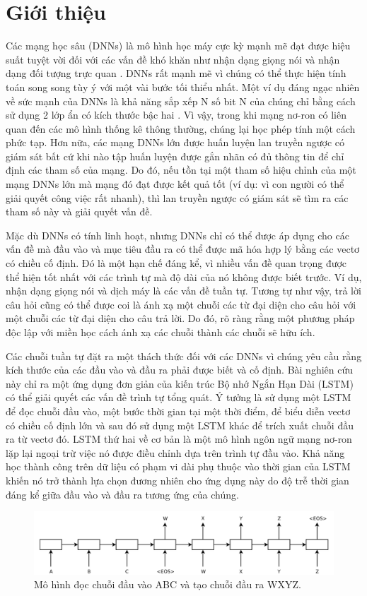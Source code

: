 \section{Giới thiệu}
Các mạng học sâu (DNNs) là mô hình học máy cực kỳ mạnh mẽ đạt được hiệu suất tuyệt vời đối với các vấn đề khó khăn như nhận dạng giọng nói \citep{hinton2012deep, DBLP:journals/taslp/DahlYDA12} và nhận dạng đối tượng trực quan \citep{DBLP:journals/cacm/KrizhevskySH17, DBLP:conf/cvpr/CiresanMS12, lecun1998gradient, LeRMDCCDN12}. DNNs rất mạnh mẽ vì chúng có thể thực hiện tính toán song song tùy ý với một vài bước tối thiểu nhất. Một ví dụ đáng ngạc nhiên về sức mạnh của DNNs là khả năng sắp xếp N số bit N của chúng chỉ bằng cách sử dụng 2 lớp ẩn có kích thước bậc hai \citep{DBLP:conf/swat/Razborov92}. Vì vậy, trong khi mạng nơ-ron có liên quan đến các mô hình thống kê thông thường, chúng lại học phép tính một cách phức tạp. Hơn nữa, các mạng DNNs lớn được huấn luyện lan truyền ngược có giám sát bất cứ khi nào tập huấn luyện được gắn nhãn có đủ thông tin để chỉ định các tham số của mạng. Do đó, nếu tồn tại một tham số hiệu chỉnh của một mạng DNNs lớn mà mạng đó đạt được kết quả tốt (ví dụ: vì con người có thể giải quyết công việc rất nhanh), thì lan truyền ngược có giám sát sẽ tìm ra các tham số này và giải quyết vấn đề.

Mặc dù DNNs có tính linh hoạt, nhưng DNNs chỉ có thể được áp dụng cho các vấn đề mà đầu vào và mục tiêu đầu ra có thể được mã hóa hợp lý bằng các vectơ có chiều cố định. Đó là một hạn chế đáng kể, vì nhiều vấn đề quan trọng được thể hiện tốt nhất với các trình tự mà độ dài của nó không được biết trước. Ví dụ, nhận dạng giọng nói và dịch máy là các vấn đề tuần tự. Tương tự như vậy, trả lời câu hỏi cũng có thể được coi là ánh xạ một chuỗi các từ đại diện cho câu hỏi với một chuỗi các từ đại diện cho câu trả lời. Do đó, rõ ràng rằng một phương pháp độc lập với miền học cách ánh xạ các chuỗi thành các chuỗi sẽ hữu ích.

Các chuỗi tuần tự đặt ra một thách thức đối với các DNNs vì chúng yêu cầu rằng kích thước của các đầu vào và đầu ra phải được biết và cố định. Bài nghiên cứu này chỉ ra một ứng dụng đơn giản của kiến trúc Bộ nhớ Ngắn Hạn Dài (LSTM) \citep{HochreiterandSchmidhuber1997} có thể giải quyết các vấn đề trình tự tổng quát. Ý tưởng là sử dụng một LSTM để đọc chuỗi đầu vào, một bước thời gian tại một thời điểm, để biểu diễn vectơ có chiều cố định lớn và sau đó sử dụng một LSTM khác để trích xuất chuỗi đầu ra từ vectơ đó. LSTM thứ hai về cơ bản là một mô hình ngôn ngữ mạng nơ-ron lặp lại \citep{Mikolov2010} ngoại trừ việc nó được điều chỉnh dựa trên trình tự đầu vào. Khả năng học thành công trên dữ liệu có phạm vi dài phụ thuộc vào thời gian của LSTM khiến nó trở thành lựa chọn đương nhiên cho ứng dụng này do độ trễ thời gian đáng kể giữa đầu vào và đầu ra tương ứng của chúng.

\begin{figure}
	\centering
	\includegraphics[scale=0.3]{img/fig1.png}
	\caption{Mô hình đọc chuỗi đầu vào ABC và tạo chuỗi đầu ra WXYZ.}
	\label{fig_1}
\end{figure}
